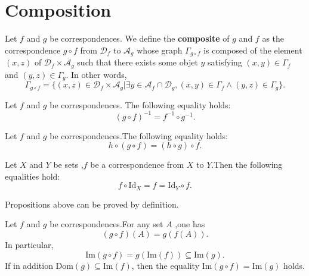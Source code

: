 \documentclass{book}
\numberwithin{equation}{section}
\begin{document}
\section{Composition}
\begin{definitionenv}
    Let $f$ and $g$ be correspondences. We define the \textbf{composite } of $g$ and $f$ as the correspondence $g\circ f$ from $\mathscr{D}_f$  to $\mathscr{A}_g$ whose graph $\Gamma_{g\circ f }$ is composed of the element $(x,z)$ of $\mathscr{D}_f\times \mathscr{A}_g$ such that there exists some objet $y$ satisfying $(x,y)\in \Gamma_f $ and $(y,z)\in \Gamma_g$. In other words,
    $$\Gamma_{g\circ f }=\{(x,z)\in \mathscr{D}_f\times \mathscr{A}_g|\exists y\in \mathscr{A}_f\cap\mathscr{D}_g,(x,y)\in \Gamma_f \wedge (y,z)\in \Gamma_g\}.$$
\end{definitionenv}
\begin{propositionenv}
    Let $f$ and $g$ be correspondences. The following equality holds:
    \begin{equation}
        (g\circ f)^{-1}=f^{-1}\circ g^{-1}.
    \end{equation}
\end{propositionenv}
\begin{propositionenv}\label{proposition3.4.2}
    Let $f$ and $g$ be correspondences.The following equality holds:
    \begin{equation}
        h\circ (g\circ f)=(h\circ g)\circ f.
    \end{equation}
\end{propositionenv}
\begin{propositionenv}\label{proposition3.4.3}
    Let $X$ and $Y$ be sets ,$f$ be a correspondence from $X$ to $Y$.Then the following equalities hold:
    $$f\circ \mathrm{Id}_X=f=\mathrm{Id}_Y\circ f.$$
\end{propositionenv}
Propositions above can be proved by definition.
\begin{propositionenv}\label{proposition3.4.4}
    Let $f$ and $g$ be correspondences.For any set $A$ ,one has 
    $$(g\circ f)(A)=g(f(A)).$$
    In particular,
    $$\mathrm{Im}(g\circ f)=g(\mathrm{Im}(f))\subseteq \mathrm{Im}(g).$$
    If in addition $\mathrm{Dom}(g)\subseteq \mathrm{Im}(f)$, then the equality $\mathrm{Im}(g\circ f)=\mathrm{Im}(g)$ holds.
\end{propositionenv}
\end{document}
